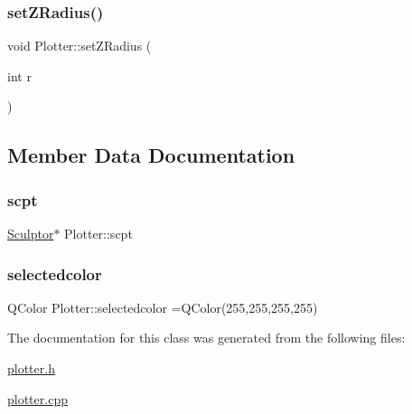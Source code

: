 \mbox{\label{class_plotter_ab1ff5f4a6357b1b8bd51edede9932ad7}} 
\subsubsection{\texorpdfstring{set\+Z\+Radius()}{setZRadius()}}
{\footnotesize\ttfamily void Plotter\+::set\+Z\+Radius (\begin{DoxyParamCaption}\item[{int}]{r }\end{DoxyParamCaption})}



\subsection{Member Data Documentation}
\mbox{\label{class_plotter_a314b26fc750a9a2fc37ac7a82b5cece6}} 
\subsubsection{\texorpdfstring{scpt}{scpt}}
{\footnotesize\ttfamily \hyperlink{class_sculptor}{Sculptor}$\ast$ Plotter\+::scpt}

\mbox{\label{class_plotter_afc5f742a96002ed3c018b006749bd2cf}} 
\subsubsection{\texorpdfstring{selectedcolor}{selectedcolor}}
{\footnotesize\ttfamily Q\+Color Plotter\+::selectedcolor =Q\+Color(255,255,255,255)}



The documentation for this class was generated from the following files\+:\begin{DoxyCompactItemize}
\item 
\hyperlink{plotter_8h}{plotter.\+h}\item 
\hyperlink{plotter_8cpp}{plotter.\+cpp}\end{DoxyCompactItemize}
